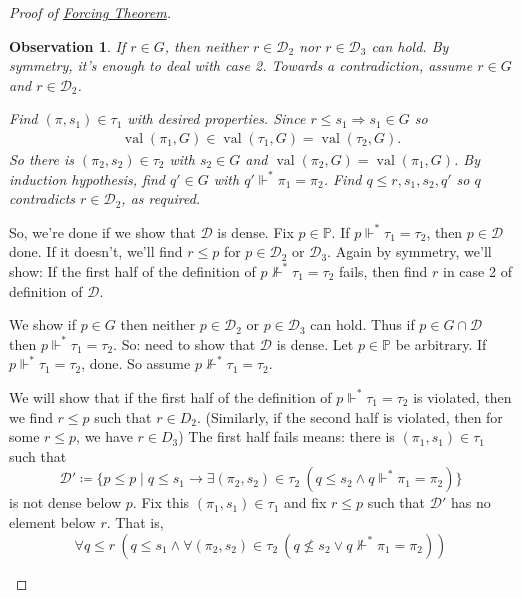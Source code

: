 \documentclass{article}
\newtheorem*{observation}{Observation}
\newcommand{\p}{\mathbb{P}}
\newcommand{\1}{\mathbbm{1}}
\DeclareMathOperator{\val}{val}
\let\forces\Vdash
\begin{document}
\begin{proof}[Proof of \hyperlink{thm:forcing}{Forcing Theorem}]
\begin{enumerate}
          \begin{observation}
            If $r \in G$, then neither $r \in \mathcal{D}_2$ nor $r \in \mathcal{D}_3$ can hold. By symmetry, it's enough to deal with case 2.
            Towards a contradiction, assume $r \in G$ and $r \in \mathcal{D}_2$.

            Find $(\pi,s_1) \in \tau_1$ with desired properties.
            Since $r \leq s_1 \Rightarrow s_1 \in G$ so
            \begin{align*}
              \val(\pi_1, G) \in \val(\tau_1,G) = \val(\tau_2,G).
            \end{align*}
            So there is $(\pi_2,s_2) \in \tau_2$ with $s_2 \in G$ and $\val(\pi_2,G) = \val(\pi_1, G)$.
            By induction hypothesis, find $q' \in G$ with $q' \forces^* \pi_1 = \pi_2$.
            Find $q \leq r,s_1,s_2, q'$ so $q$ contradicts $r \in \mathcal{D}_2$, as required.
          \end{observation}

          So, we're done if we show that $\mathcal{D}$ is dense.
          Fix $p \in \p$. If $p \forces^* \tau_1 = \tau_2$, then $p \in \mathcal{D}$ done.
          If it doesn't, we'll find $r \leq p$ for $p \in \mathcal{D}_2$ or $\mathcal{D}_3$.
          Again by symmetry, we'll show: If the first half of the definition of $p \not\forces^* \tau_1 = \tau_2$ fails, then find $r$ in case 2 of definition of $\mathcal{D}$.

          \newlec
          We show if $p \in G$ then neither $p \in \mathcal{D}_2$ or $p \in \mathcal{D}_3$ can hold. Thus if $p \in G \cap \mathcal{D} $ then $p \forces^* \tau_1 = \tau_2$.
          So: need to show that $ \mathcal{D} $ is dense.
          Let $p \in \p$ be arbitrary. If $p \forces^* \tau_1 = \tau_2$, done. So assume $p \not\forces^* \tau_1 = \tau_2$.

          We will show that if the first half of the definition of $ p\forces^* \tau_1 = \tau_2$ is violated, then we find $r \leq p$ such that $r \in D_2$. (Similarly, if the second half is violated, then for some $r \leq p$, we have $r \in D_3$)
          The first half fails means:
          there is $(\pi_1,s_1) \in \tau_1$ such that
          \begin{equation*}
            \mathcal{D}' \coloneqq \{p \leq p \mid q \leq s_1 \rightarrow \exists (\pi_2,s_2) \in \tau_2 \ (q \leq s_2 \land q \forces^* \pi_1 = \pi_2)\}
          \end{equation*}
          is not dense below $p$.
          Fix this $(\pi_1, s_1) \in \tau_1$ and fix $r \leq p$ such that $\mathcal{D}'$ has no element below $r$.
          That is,
          \begin{equation*}
            \forall q \leq r \ (q \leq s_1 \land \forall (\pi_2,s_2) \in \tau_2 \ (q \nleq s_2 \lor q \not\forces^* \pi_1 = \pi_2)) \tag{$*$}\label{eq:1}
          \end{equation*}


\end{enumerate}
\end{proof}
\end{document}
